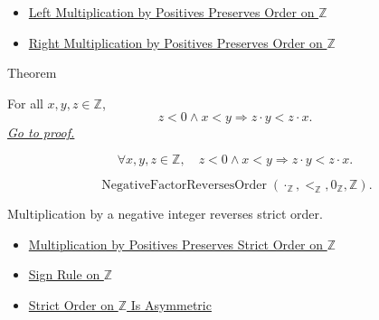 \begin{dependencies}
\begin{itemize}
  \item \hyperref[thm:left-positive-multiplication-preserves-order-on-z]{Left Multiplication by Positives Preserves Order on $\mathbb{Z}$}
  \item \hyperref[cor:right-positive-multiplication-preserves-order-on-z]{Right Multiplication by Positives Preserves Order on $\mathbb{Z}$}
\end{itemize}
\end{dependencies}

\begin{theorembox}{Theorem}
\begin{theorem}
\label{thm:negative-multiplication-reverses-strict-order-on-z}
For all $x,y,z\in\mathbb{Z}$,
\[
z<0\land x<y \Longrightarrow z\cdot y<z\cdot x.
\]
\hyperref[prf:negative-multiplication-reverses-strict-order-on-z]{\textit{Go to proof.}}
\end{theorem}
\end{theorembox}

\begin{remark*}
\[
\forall x,y,z\in\mathbb{Z},\quad
z<0\land x<y \Longrightarrow z\cdot y<z\cdot x.
\]
\end{remark*}

\begin{remark*}
\[
\operatorname{NegativeFactorReversesOrder}(\cdot_{\mathbb{Z}},<_{\mathbb{Z}},0_{\mathbb{Z}},\mathbb{Z}).
\]
\end{remark*}

\begin{remark*}[Interpretation]
Multiplication by a negative integer reverses strict order.
\end{remark*}

\begin{dependencies}
\begin{itemize}
  \item \hyperref[thm:positive-multiplication-preserves-strict-order-on-z]{Multiplication by Positives Preserves Strict Order on $\mathbb{Z}$}
  \item \hyperref[cor:sign-rule-on-z]{Sign Rule on $\mathbb{Z}$}
  \item \hyperref[thm:strict-order-on-z-asymmetric]{Strict Order on $\mathbb{Z}$ Is Asymmetric}
\end{itemize}
\end{dependencies}

